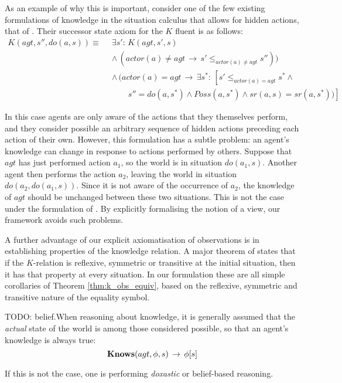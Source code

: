 As an example of why this is important, consider one of the few existing
formulations of knowledge in the situation calculus that allows for
hidden actions, that of \citep{Lesperance99sitcalc_approach}. Their
successor state axiom for the $K$ fluent is as follows:\begin{align*}
K(agt,s'',do(a,s))\equiv\,\,\, & \exists s':\, K(agt,s',s)\\
 & \wedge\,(actor(a)\neq agt\,\rightarrow\, s'\leq_{actor(a)\neq agt}s''))\\
 & \wedge\,(actor(a)=agt\,\rightarrow\,\exists s^{*}:\,\left[s'\leq_{actor(a)=agt}s^{*}\wedge\right.\\
 & \,\,\,\,\,\,\,\,\,\,\,\,\left.s''=do(a,s^{*})\wedge Poss(a,s^{*})\wedge sr(a,s)=sr(a,s^{*}))\right]\end{align*}


In this case agents are only aware of the actions that they themselves
perform, and they consider possible an arbitrary sequence of hidden
actions preceding each action of their own. However, this formulation
has a subtle problem: an agent's knowledge can change in response
to actions performed by others. Suppose that $agt$ has just performed
action $a_{1}$, so the world is in situation $do(a_{1},s)$. Another
agent then performs the action $a_{2}$, leaving the world in situation
$do(a_{2},do(a_{1},s))$. Since it is not aware of the occurrence
of $a_{2}$, the knowledge of $agt$ should be unchanged between these
two situations. This is not the case under the formulation of \citeauthor{Lesperance99sitcalc_approach}.
By explicitly formalising the notion of a view, our framework avoids
such problems.

A further advantage of our explicit axiomatisation of observations
is in establishing properties of the knowledge relation. A major theorem
of \citet{scherl03sc_knowledge} states that if the $K$-relation
is reflexive, symmetric or transitive at the initial situation, then
it has that property at every situation. In our formulation these
are all simple corollaries of Theorem \ref{thm:k_obs_equiv}, based
on the reflexive, symmetric and transitive nature of the equality
symbol.

TODO: belief.When reasoning about knowledge, it is generally assumed
that the \emph{actual} state of the world is among those considered
possible, so that an agent's knowledge is always true:\[
\mathbf{Knows}(agt,\phi,s)\,\rightarrow\,\phi[s]\]


If this is not the case, one is performing \emph{doxastic} or belief-based
reasoning.

